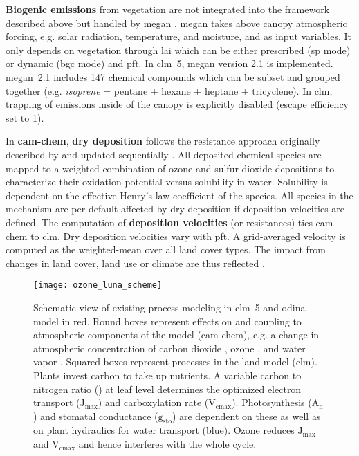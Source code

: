 \textbf{Biogenic emissions} from vegetation are not integrated into the framework described above but handled by \gls{megan} \textcite{ACP:Guenther2006}. \gls{megan} takes above canopy atmospheric forcing, e.g. solar radiation, temperature, and moisture, and \ch{[CO_2]} as input variables. It only depends on vegetation through \gls{lai} which can be either prescribed (\gls{sp} mode) or dynamic (\gls{bgc} mode) and \gls{pft}. In \gls{clm}~5, \gls{megan} version 2.1 \parencite{GMD:Guenther2012} is implemented. \gls{megan}~2.1 includes 147 chemical compounds which can be subset and grouped together (e.g. \emph{isoprene} = pentane + hexane + heptane + tricyclene). In \gls{clm}, trapping of emissions inside of the canopy is explicitly disabled (escape efficiency set to 1).

In \textbf{\gls{cam}-chem}, \textbf{dry deposition} follows the resistance approach originally described by \textcites{AE:Wesely1989}{AE:Walcek1986} and updated sequentially \parencites{AE:Walmsley1996}{AE:Wesely2000}. All deposited chemical species are mapped to a weighted-combination of ozone and sulfur dioxide depositions to characterize their oxidation potential versus solubility in water. Solubility is dependent on the effective Henry’s law coefficient of the species. All species in the mechanism are per default affected by dry deposition if deposition velocities are defined. 
The computation of \textbf{deposition velocities} (or resistances) ties \gls{cam}-chem to \gls{clm}. Dry deposition velocities vary with \gls{pft}. A grid-averaged velocity is computed as the weighted-mean over all land cover types. The impact from changes in land cover, land use or climate are thus reflected \parencite{GMD:Lamarque2012}. 

\begin{wrapfigure}[]{L}[0pt]{0.5\textwidth}
  \centering
  \texttt{[image: ozone\_luna\_scheme]}
  \caption{Schematic view of existing process modeling in \gls{clm}~5 and \gls{odina} model in red. Round boxes represent effects on and coupling to atmospheric components of the model (\gls{cam}-chem), e.g. a change in atmospheric concentration of carbon dioxide \ch{[CO_2]}, ozone \ch{[O_3]}, and water vapor \ch{[H_2O]}. Squared boxes represent processes in the land model (\gls{clm}). Plants invest carbon to take up nutrients. A variable carbon to nitrogen ratio () at leaf level determines the optimized electron transport ($\mathrm{J_{max}}$) and carboxylation rate ($\mathrm{V_{cmax}}$). Photosynthesis ($\mathrm{A_n}$) and stomatal conductance ($\mathrm{g_{sto}}$) are dependent on these as well as on plant hydraulics for water transport (blue). Ozone reduces $\mathrm{J_{max}}$ and $\mathrm{V_{cmax}}$ and hence interferes with the whole cycle.
}
  \label{fig:ozone_odina}
\end{wrapfigure}

